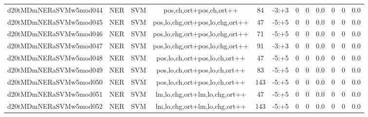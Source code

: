 \documentclass[a4paper]{article}
\begin{document}
\begin{landscape}
\begin{center}
\begin{tabular}{ |c|c|c|c|c|c|c|c|c|c|c|c|}
 	

 
 	
 	\small{ d20tMDmNERaSVMw5mod044 } & \small{ NER} & \small{  SVM }  & pos,ch,ort+pos,ch,ort++  &  84 &  \small{  -3:+3 }  &  0 & 0 & 0.0  &  0 & 0 & 0.0 \\
 	

 
 	
 	\small{ d20tMDmNERaSVMw5mod045 } & \small{ NER} & \small{  SVM }  & pos,lo,chg,ort+pos,lo,chg,ort++  &  47 &  \small{  -5:+5 }  &  0 & 0 & 0.0  &  0 & 0 & 0.0 \\
 	

 
 	
 	\small{ d20tMDmNERaSVMw5mod046 } & \small{ NER} & \small{  SVM }  & pos,lo,chg,ort+pos,lo,chg,ort++  &  71 &  \small{  -5:+5 }  &  0 & 0 & 0.0  &  0 & 0 & 0.0 \\
 	

 
 	
 	\small{ d20tMDmNERaSVMw5mod047 } & \small{ NER} & \small{  SVM }  & pos,lo,chg,ort+pos,lo,chg,ort++  &  91 &  \small{  -3:+3 }  &  0 & 0 & 0.0  &  0 & 0 & 0.0 \\
 	

 
 	
 	\small{ d20tMDmNERaSVMw5mod048 } & \small{ NER} & \small{  SVM }  & pos,lo,ch,ort+pos,lo,ch,ort++  &  47 &  \small{  -5:+5 }  &  0 & 0 & 0.0  &  0 & 0 & 0.0 \\
 	

 
 	
 	\small{ d20tMDmNERaSVMw5mod049 } & \small{ NER} & \small{  SVM }  & pos,lo,ch,ort+pos,lo,ch,ort++  &  83 &  \small{  -5:+5 }  &  0 & 0 & 0.0  &  0 & 0 & 0.0 \\
 	

 
 	
 	\small{ d20tMDmNERaSVMw5mod050 } & \small{ NER} & \small{  SVM }  & pos,lo,ch,ort+pos,lo,ch,ort++  &  143 &  \small{  -5:+5 }  &  0 & 0 & 0.0  &  0 & 0 & 0.0 \\
 	

 
 	
 	\small{ d20tMDmNERaSVMw5mod051 } & \small{ NER} & \small{  SVM }  & lm,lo,chg,ort+lm,lo,chg,ort++  &  47 &  \small{  -5:+5 }  &  0 & 0 & 0.0  &  0 & 0 & 0.0 \\
 	

 
 	
 	\small{ d20tMDmNERaSVMw5mod052 } & \small{ NER} & \small{  SVM }  & lm,lo,chg,ort+lm,lo,chg,ort++  &  143 &  \small{  -5:+5 }  &  0 & 0 & 0.0  &  0 & 0 & 0.0 \\
 	


\end{tabular}
\end{center}
\end{landscape}
\end{document}
